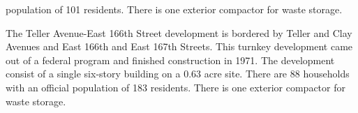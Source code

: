 population of 101 residents. There is one exterior compactor for waste storage.\par \vspace{.7\baselineskip}The Teller Avenue-East 166th Street development is bordered by Teller and Clay Avenues and East 166th and East 167th Streets. This turnkey development came out of a federal program and finished construction in 1971. The development consist of a single six-story building on a 0.63 acre site. There are 88 households with an official population of 183 residents. There is one exterior compactor for waste storage.